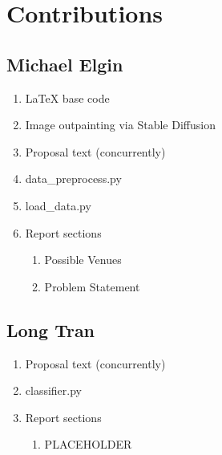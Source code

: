\documentclass[conference]{IEEEtran}
\begin{document}
\section{Contributions}

\subsection{Michael Elgin}
\begin{enumerate}
    \item LaTeX base code
    \item Image outpainting via Stable Diffusion
    \item Proposal text (concurrently)
    \item data\_preprocess.py
    \item load\_data.py
    \item Report sections
    \begin{enumerate}
        \item Possible Venues
        \item Problem Statement
    \end{enumerate}
\end{enumerate}

\subsection{Long Tran}
\begin{enumerate}
    \item Proposal text (concurrently)
    \item classifier.py
    \item Report sections
    \begin{enumerate}
        \item PLACEHOLDER
    \end{enumerate}
\end{enumerate}

\cite{example}

\printbibliography
\end{document}
